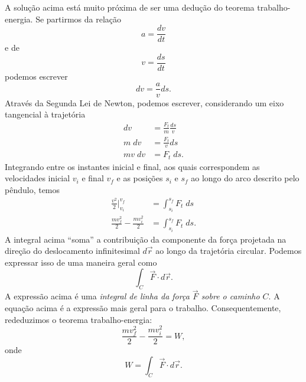 A solução acima está muito próxima de ser uma dedução do teorema trabalho-energia. Se partirmos da relação
\begin{equation}
    a = \frac{dv}{dt}
\end{equation}
%
e de
\begin{equation}
    v = \frac{ds}{dt}
\end{equation}
%
podemos escrever
\begin{equation}
    dv = \frac{a}{v} ds.
\end{equation}
%
Através da Segunda Lei de Newton, podemos escrever, considerando um eixo tangencial à trajetória
\begin{align}
    dv &= \frac{F_t}{m} \frac{ds}{v} \\
    m \; dv &= \frac{F_t}{v} ds \\
    mv \; dv &= F_t \; ds.
\end{align}
%
Integrando entre os instantes inicial e final, aos quais correspondem as velocidades inicial $v_i$ e final $v_f$ e as posições $s_i$ e $s_f$ ao longo do arco descrito pelo pêndulo, temos
\begin{align}
    \frac{v^2}{2}\Big|_{v_i}^{v_f} &= \int_{s_i}^{s_f} F_t \; ds \\
    \frac{mv_f^2}{2} - \frac{mv_i^2}{2} &= \int_{s_i}^{s_f} F_t \; ds.
\end{align}
%
A integral acima ``soma'' a contribuição da componente da força projetada na direção do deslocamento infinitesimal $d\vec{r}$ ao longo da trajetória circular. Podemos expressar isso de uma maneira geral como
\begin{equation}
    \int_C \vec{F} \cdot d\vec{r}.
\end{equation}
%
A expressão acima é uma \emph{integral de linha da força $\vec{F}$ sobre o caminho $C$}. A equação acima é a expressão mais geral para o trabalho. Consequentemente, rededuzimos o teorema trabalho-energia:
\begin{equation}
    \frac{mv_f^2}{2} - \frac{mv_i^2}{2} = W,
\end{equation}
%
onde
\begin{equation}
    W = \int_C \vec{F} \cdot d\vec{r}.
\end{equation}


